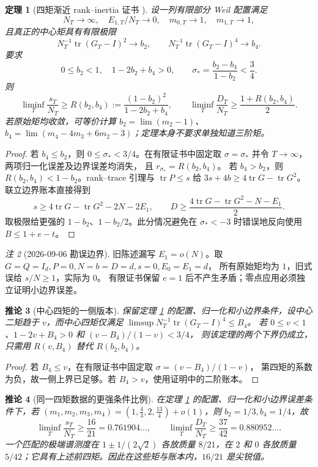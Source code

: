 \documentclass[UTF8,11pt,a4paper]{ctexart}
\newtheorem{theorem}{定理}[section]
\newtheorem{corollary}[theorem]{推论}
\theoremstyle{definition}
\theoremstyle{remark}
\newtheorem{remark}[theorem]{注}
\newcommand{\tr}{\operatorname{tr}}
\begin{document}
\begin{theorem}[四矩渐近 rank--inertia 证书 {\cite{Notik26}}]
\label{thm:quartic}
设一列有限部分 Weil 配置满足
\[
 N_T\to\infty,\quad E_{1,T}/N_T\to0,\quad m_{0,T}\to1,\quad m_{1,T}\to1,
\]
且真正的中心矩具有有限极限
\[
 N_T^{-1}\tr(G_T-I)^2\to b_2,\qquad
 N_T^{-1}\tr(G_T-I)^4\to b_4.
\]
要求
\[
 0\le b_2<1,\quad 1-2b_2+b_4>0,\qquad
 \sigma_*=\frac{b_2-b_4}{1-b_2}<\frac34 .
\]
则
\[
 \liminf_T\frac{s_T}{N_T}\ge
 R(b_2,b_4):=\frac{(1-b_2)^2}{1-2b_2+b_4},\qquad
 \liminf_T\frac{D_T}{N_T}\ge\frac{1+R(b_2,b_4)}2.
\]
若原始矩均收敛，可等价计算 $b_2=\lim(m_2-1)$、
$b_4=\lim(m_4-4m_3+6m_2-3)$；定理本身不要求单独知道三阶矩。
\end{theorem}

\begin{proof}
若 $b_4\le b_2$，则 $0\le\sigma_*<3/4$。在有限证书中固定取
$\sigma=\sigma_*$ 并令 $T\to\infty$，两项归一化误差及边界误差均消失，
且 $r_{\sigma_*}=R(b_2,b_4)$。
若 $b_4>b_2$，则 $R(b_2,b_4)<1-b_2$。rank--trace 引理与
$\tr P\le s$ 给 $3s+4b\ge4\tr G-\tr G^2$。联立边界账本直接得到
\[
 s\ge4\tr G-\tr G^2-2N-2E_1,\qquad
 D\ge\frac{4\tr G-\tr G^2-N-E_1}{2}.
\]
取极限给更强的 $1-b_2$、$1-b_2/2$。此分情况避免在
$\sigma_*<-3$ 时错误地反向使用 $B\le1+e-t$。
\end{proof}

\begin{remark}[2026-09-06 勘误边界]
旧陈述漏写 $E_1=o(N)$。取 $G=Q=I_d,P=0,N=b=D=d,s=0,E_0=E_1=d$，
所有原始矩均为 $1$，旧式误给 $s/N\ge1$，实际为 $0$。
有限证书保留 $e=1$ 后不产生矛盾；零点应用必须独立证明小边界误差。
\end{remark}

\begin{corollary}[中心四矩的一侧版本]\label{cor:quartic-upper}
保留定理 \ref{thm:quartic} 的配置、归一化和小边界条件，设中心二矩趋于
$v$，而中心四矩仅满足 $\limsup N_T^{-1}\tr(G_T-I)^4\le B_4$。
若 $0\le v<1$、$1-2v+B_4>0$ 和 $(v-B_4)/(1-v)<3/4$，
则该定理的两个下界仍成立，只需用 $R(v,B_4)$ 替代 $R(b_2,b_4)$。
\end{corollary}

\begin{proof}
若 $B_4\le v$，在有限证书中固定取 $\sigma=(v-B_4)/(1-v)$，
第四矩的系数为负，故一侧上界已足够。若 $B_4>v$，使用证明中的二阶账本。
\end{proof}

\begin{corollary}[同一四矩数据的更强条件比例]
在定理 \ref{thm:quartic} 的配置、归一化和小边界误差条件下，若
$(m_1,m_2,m_3,m_4)=(1,\frac43,2,\frac{13}{4})+o(1)$，则
$b_2=1/3,b_4=1/4$，故
\[
 \liminf_T\frac{s_T}{N_T}\ge\frac{16}{21}=0.761904\ldots,\qquad
 \liminf_T\frac{D_T}{N_T}\ge\frac{37}{42}=0.880952\ldots.
\]
一个匹配的极端谱测度在
$1\pm1/(2\sqrt2)$ 各放质量 $8/21$，在 $2$ 和 $0$ 各放质量
$5/42$；它具有上述前四矩。因此在这些矩与账本内，$16/21$ 是尖锐值。
\end{corollary}
\end{document}
